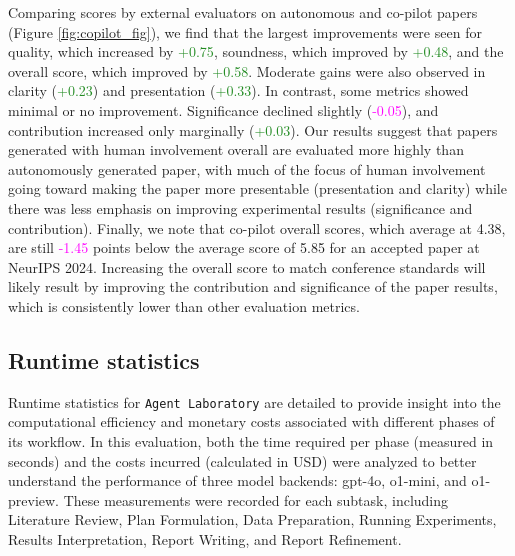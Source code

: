 \documentclass[11pt, a4paper]{gdm_format}
\begin{document}
Comparing scores by external evaluators on autonomous and co-pilot papers (Figure \ref{fig:copilot_fig}), we find that the largest improvements were seen for quality, which increased by \textcolor{ForestGreen}{+0.75}, soundness, which improved by \textcolor{ForestGreen}{+0.48}, and the overall score, which improved by \textcolor{ForestGreen}{+0.58}. Moderate gains were also observed in clarity (\textcolor{ForestGreen}{+0.23}) and presentation (\textcolor{ForestGreen}{+0.33}). In contrast, some metrics showed minimal or no improvement. Significance declined slightly (\textcolor{Magenta}{-0.05}), and contribution increased only marginally (\textcolor{ForestGreen}{+0.03}). Our results suggest that papers generated with human involvement overall are evaluated more highly than autonomously generated paper, with much of the focus of human involvement going toward making the paper more presentable (presentation and clarity) while there was less emphasis on improving experimental results (significance and contribution). 
Finally, we note that co-pilot overall scores, which average at 4.38, are still \textcolor{Magenta}{-1.45} points below the average score of 5.85 for an accepted paper at NeurIPS 2024. Increasing the overall score to match conference standards will likely result by improving the contribution and significance of the paper results, which is consistently lower than other evaluation metrics. 




\subsection{Runtime statistics}



Runtime statistics for \texttt{Agent Laboratory} are detailed to provide insight into the computational efficiency and monetary costs associated with different phases of its workflow. In this evaluation, both the time required per phase (measured in seconds) and the costs incurred (calculated in USD) were analyzed to better understand the performance of three model backends: gpt-4o, o1-mini, and o1-preview. These measurements were recorded for each subtask, including Literature Review, Plan Formulation, Data Preparation, Running Experiments, Results Interpretation, Report Writing, and Report Refinement.
\end{document}
